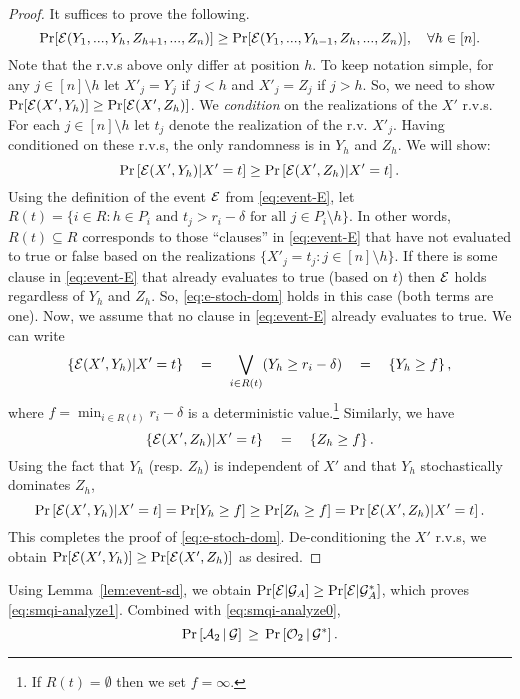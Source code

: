 \documentclass[11pt]{article}
\theoremstyle{remark}
\theoremstyle{plain}
\theoremstyle{remark}
\begin{document}
\begin{proof}
It suffices to  prove the following. 
\[ \Pr[ {\cal E}(Y_1,...,Y_h, Z_{h+1}, ...,Z_n) ] \ge  \Pr[{\cal E}(Y_1,...,Y_{h-1}, Z_{h}, ...,Z_n)],\quad \forall h\in [n]. \]
Note that the r.v.s above only differ at position $h$. To keep notation simple, for any $j\in [n]\setminus h$ let $X'_j=Y_j$ if $j<h$ and $X'_j=Z_j$ if $j>h$. So, we need to show $\Pr[{\cal E}(X' , Y_h)] \ge \Pr[{\cal E}(X' , Z_h)]$. 
We  {\em  condition} on the realizations of  the $X'$ r.v.s. For each $j\in [n]\setminus h$ let $t_j$ denote the realization of the  r.v. $X'_j$. 
Having conditioned on these r.v.s, the only randomness is in $Y_h$ and $Z_h$. We will show:
\begin{equation} \label{eq:e-stoch-dom}
\Pr\left[ {\cal E}(X' , Y_h) | X'=t\right]  \ge   \Pr\left[ {\cal E}(X' , Z_h) | X'=t\right] .
\end{equation}
 Using the definition of the event ${\cal E}$ from \eqref{eq:event-E}, let $R(t) = \{i\in R : h\in P_i \text{ and } t_j>r_i-\delta \text{ for all }j\in P_i\setminus h\}$. In other words, $R(t)\subseteq R$ corresponds to those ``clauses'' in  \eqref{eq:event-E} that have not evaluated to true or false based on the realizations $\{ X'_j=t_j : j\in [n]\setminus h\}$. If there is some clause in  \eqref{eq:event-E} that already evaluates to true (based on $t$) then ${\cal E}$ holds regardless of $Y_h$ and $Z_h$. So,  \eqref{eq:e-stoch-dom} holds in this case (both terms are one). Now, we assume that no clause in  \eqref{eq:event-E}  already evaluates to true. We can write  
$$\left\{ {\cal E}(X' , Y_h) | X'=t\right\} \quad =\quad \bigvee_{i \in R(t)  } ( Y_h\ge r_i - \delta) \quad =\quad \left\{ Y_h \ge f \right\}, $$
where $f=  \min_{i\in R(t)} r_i -\delta$ is a deterministic value.\footnote{If $R(t)=\emptyset$ then we set $f=\infty$.} Similarly, we have
$$\left\{ {\cal E}(X' , Z_h) | X'=t\right\} \quad =\quad \left\{ Z_h \ge f \right\}. $$
  Using the fact that $Y_h$ (resp. $Z_h$) is independent of $X'$ and that $Y_h$ stochastically dominates $Z_h$,
$$ \Pr\left[ {\cal E}(X' , Y_h) | X'=t\right] = \Pr[Y_h\ge f] \ge \Pr[Z_h\ge f] = \Pr\left[ {\cal E}(X' , Z_h) | X'=t\right]. $$
This completes the proof of \eqref{eq:e-stoch-dom}. De-conditioning the $X'$ r.v.s, we obtain $\Pr[{\cal E}(X' , Y_h)] \ge \Pr[{\cal E}(X' , Z_h)]$ as desired.
\end{proof}
 
Using Lemma~\ref{lem:event-sd}, we obtain   $\Pr[{\cal E}  | {\cal G}_A] \ge \Pr[{\cal E} | {\cal G}^*_A]$, which proves \eqref{eq:smqi-analyze1}. Combined with \eqref{eq:smqi-analyze0},  
 \begin{equation}\label{eq:smqi-analyze2}
 \Pr\left[{\cal A}_2\, |\, {\cal G} \right] \,\ge\,  \Pr\left[{\cal O}_2\, | \, {\cal G}^* \right].
\end{equation} 
\end{document}
